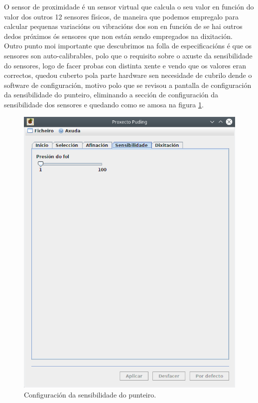    O sensor de proximidade é un sensor virtual que calcula o seu valor en
   función do valor dos outros 12 sensores físicos, de maneira que podemos
   empregalo para calcular pequenas variacións ou vibracións dos son en función
   de se hai outros dedos próximos ós sensores que non están sendo empregados
   na dixitación. \\
   
   Outro punto moi importante que descubrimos na folla de especificacións é que
   os sensores son auto-calibrables, polo que o requisito sobre o axuste da
   sensibilidade do sensores, logo de facer probas con distinta xente e vendo
   que os valores eran correctos, quedou cuberto pola parte hardware sen
   necesidade de cubrilo dende o software de configuración, motivo polo que se
   revisou a pantalla de configuración da sensibilidade do punteiro, eliminando
   a sección de configuración da sensibilidade dos sensores e quedando como se
   amosa na figura \ref{figura:ConfiguracionSensibilidade}. \\
   
   \begin{figure}[htbp]
    \centering
    \includegraphics[scale=0.6, keepaspectratio=true]{./imagenes/configuracion-sensibilidade.png}
    \caption{Configuración da sensibilidade do punteiro.}
    \label{figura:ConfiguracionSensibilidade}
   \end{figure}
   
